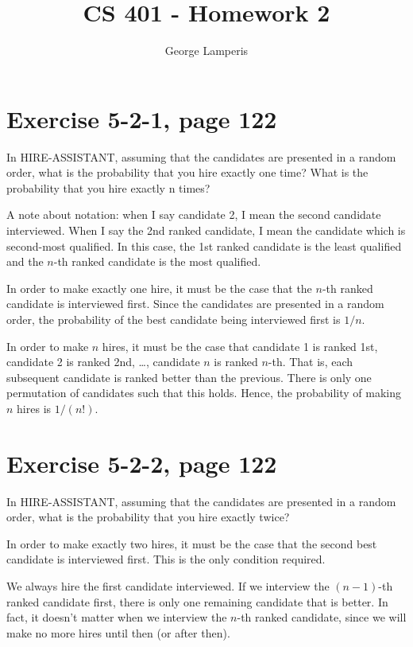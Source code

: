 \documentclass[letterpaper, 12pt, oneside]{memoir}
\title{CS 401 - Homework 2}
\author{George Lamperis}
\date{}
\begin{document}
\maketitle

\section*{Exercise 5-2-1, page 122}
In HIRE-ASSISTANT, assuming that the candidates are presented in a random order,
what is the probability that you hire exactly one time? What is the probability
that you hire exactly n times?


A note about notation: when I say candidate 2, I mean the second candidate
interviewed. When I say the 2nd ranked candidate, I mean the candidate which is
second-most qualified. In this case, the 1st ranked candidate is the least 
qualified and the $n$-th ranked candidate is the most qualified. 


In order to make exactly one hire, it must be the case that the $n$-th ranked
candidate is interviewed first. Since the candidates are presented in a random
order, the probability of the best candidate being interviewed first is $1/n$.

In order to make $n$ hires, it must be the case that candidate 1 is ranked 1st,
candidate 2 is ranked 2nd, \ldots, candidate $n$ is ranked $n$-th. That is,
each subsequent candidate is ranked better than the previous. There is only one 
permutation of candidates such that this holds. Hence, the probability of making
$n$ hires is $1/(n!)$.


\section*{Exercise 5-2-2, page 122}
In HIRE-ASSISTANT, assuming that the candidates are presented in a random order,
what is the probability that you hire exactly twice?

In order to make exactly two hires, it must be the case that the second best
candidate is interviewed first. This is the only condition required.

We always hire the first candidate interviewed. If we interview the $(n-1)$-th
ranked candidate first, there is only one remaining candidate that is better.
In fact, it doesn't matter when we interview the $n$-th ranked candidate,
since we will make no more hires until then (or after then). 
\end{document}
